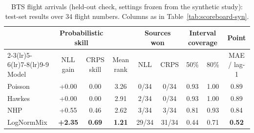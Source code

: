 \begin{table}[t]
\centering\small
\caption{BTS flight arrivals (held-out check, settings frozen from the synthetic study): test-set results over 34 flight numbers. Columns as in Table~\ref{tab:scoreboard-syn}.}
\label{tab:scoreboard-bts}
\begin{tabular}{lcccccccc}
\toprule
 & \multicolumn{2}{c}{Probabilistic skill} & & \multicolumn{2}{c}{Sources won} & \multicolumn{2}{c}{Interval coverage} & Point \\
\cmidrule(lr){2-3}\cmidrule(lr){5-6}\cmidrule(lr){7-8}\cmidrule(lr){9-9}
Model & NLL gain & CRPS skill & Mean rank & NLL & CRPS & 50\% & 80\% & MAE / lag-1 \\
\midrule
Poisson & +0.00 & 0.00 & 3.26 & 0/34 & 0/34 & 0.93 & 1.00 & 0.89 \\
Hawkes & +0.00 & 0.00 & 2.91 & 2/34 & 0/34 & 0.93 & 1.00 & 0.89 \\
NHP & +0.55 & 0.46 & 2.62 & 3/34 & 3/34 & 0.81 & 0.93 & 0.84 \\
LogNormMix & \textbf{+2.35} & \textbf{0.69} & \textbf{1.21} & 29/34 & 31/34 & 0.44 & 0.71 & \textbf{0.52} \\
\bottomrule
\end{tabular}
\end{table}
